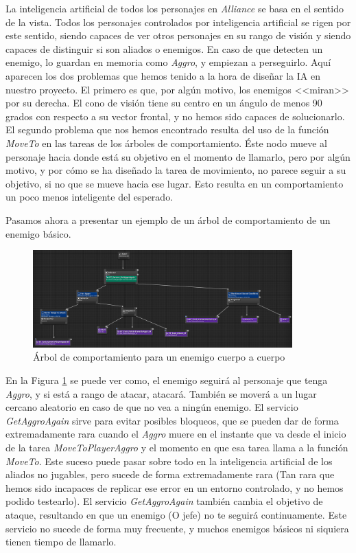 La inteligencia artificial de todos los personajes en \textit{Alliance} se basa en el sentido de la vista. Todos los personajes controlados por inteligencia artificial se rigen por este sentido, siendo capaces de ver otros personajes en su rango de visión y siendo capaces de distinguir si son aliados o enemigos. En caso de que detecten un enemigo, lo guardan en memoria como \textit{Aggro}, y empiezan a perseguirlo. Aquí aparecen los dos problemas que hemos tenido a la hora de diseñar la \ac{IA} en nuestro proyecto. El primero es que, por algún motivo, los enemigos <<miran>> por su derecha. El cono de visión tiene su centro en un ángulo de menos 90 grados con respecto a su vector frontal, y no hemos sido capaces de solucionarlo. El segundo problema que nos hemos encontrado resulta del uso de la función \textit{MoveTo} en las tareas de los árboles de comportamiento. Éste nodo mueve al personaje hacia donde está su objetivo en el momento de llamarlo, pero por algún motivo, y por cómo se ha diseñado la tarea de movimiento, no parece seguir a su objetivo, si no que se mueve hacia ese lugar. Esto resulta en un comportamiento un poco menos inteligente del esperado.


Pasamos ahora a presentar un ejemplo de un árbol de comportamiento de un enemigo básico. 

\begin{figure}[H]
  \centering
  \includegraphics[width=10cm]{./images/BT_Basic.png}
  \caption{Árbol de comportamiento para un enemigo cuerpo a cuerpo}
  \label{BTBasic}
\end{figure}


En la Figura \ref{BTBasic} se puede ver como, el enemigo seguirá al personaje que tenga \textit{Aggro}, y si está a rango de atacar, atacará. También se moverá a un lugar cercano aleatorio en caso de que no vea a ningún enemigo. El servicio \textit{GetAggroAgain} sirve para evitar posibles bloqueos, que se pueden dar de forma extremadamente rara cuando el \textit{Aggro} muere en el instante que va desde el inicio de la tarea \textit{MoveToPlayerAggro} y el momento en que esa tarea llama a la función \textit{MoveTo}. Este suceso puede pasar sobre todo en la inteligencia artificial de los aliados no jugables, pero sucede de forma extremadamente rara (Tan rara que hemos sido incapaces de replicar ese error en un entorno controlado, y no hemos podido testearlo). El servicio \textit{GetAggroAgain} también cambia el objetivo de ataque, resultando en que un enemigo (O jefe) no te seguirá continuamente. Este servicio no sucede de forma muy frecuente, y muchos enemigos básicos ni siquiera tienen tiempo de llamarlo.


